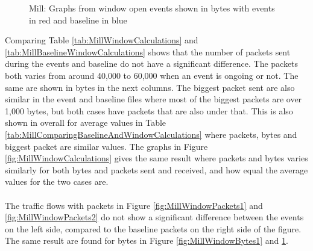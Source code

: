 \begin{figure}[H]
\begin{subfigure}[b]{0.47\textwidth}
        \centering
    \end{subfigure}
        \begin{subfigure}[b]{0.47\textwidth}
        \centering
    \end{subfigure}
    \begin{subfigure}[b]{0.47\textwidth}
        \centering
    \end{subfigure}
    \begin{subfigure}[b]{0.47\textwidth}
        \centering
    \end{subfigure}
    \hspace{0.6cm}
    \begin{subfigure}[b]{0.47\textwidth}
    \centering
        \end{subfigure}
    \caption{Mill: Graphs from window open events shown in bytes with events in red and baseline in blue}
    \label{fig:MillWindowBytes2}
\end{figure}

Comparing Table \ref{tab:MillWindowCalculations} and \ref{tab:MillBaselineWindowCalculations} shows that the number of packets sent during the events and baseline do not have a significant difference. The packets both varies from around 40,000 to 60,000 when an event is ongoing or not. The same are shown in bytes in the next columns. The biggest packet sent are also similar in the event and baseline files where most of the biggest packets are over 1,000 bytes, but both cases have packets that are also under that. This is also shown in overall for average values in Table \ref{tab:MillComparingBaselineAndWindowCalculations} where packets, bytes and biggest packet are similar values. The graphs in Figure \ref{fig:MillWindowCalculations} gives the same result where packets and bytes varies similarly for both bytes and packets sent and received, and how equal the average values for the two cases are. 
\\\\
The traffic flows with packets in Figure \ref{fig:MillWindowPackets1} and \ref{fig:MillWindowPackets2} do not show a significant difference between the events on the left side, compared to the baseline packets on the right side of the figure. The same result are found for bytes in Figure \ref{fig:MillWindowBytes1} and \ref{fig:MillWindowBytes2}. 

